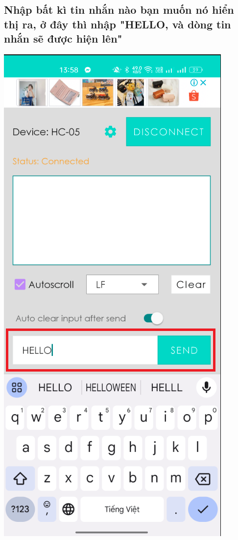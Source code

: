 \documentclass[conference]{IEEEtran}
\begin{document}
\subsection{Nhập bất kì tin nhắn nào bạn muốn nó hiển thị ra, ở đây thì nhập "HELLO, và dòng tin nhắn sẽ được hiện lên"}\label{SCM}
    \centering
    \includegraphics[width=0.7\linewidth]{5.png}
    \label{fig:enter-label}
        \centering
\end{document}

